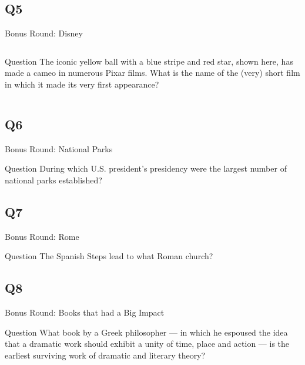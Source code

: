 \documentclass[11pt]{beamer}
\begin{document}
\subsection*{Q5}
\begin{frame}[t]{Bonus Round: Disney}
\begin{columns}[T,totalwidth=\linewidth]
\begin{column}{0.32\linewidth}
\begin{block}{Question}
The iconic yellow ball with a blue stripe and red star, shown here, has made a cameo in numerous Pixar films. What is the name of the (very) short film in which it made its very first appearance?
\end{block}
\end{column}
\begin{column}{0.65\linewidth}
\begin{center}
\texttt{[image: \{Images/luxoball]}.jpg}
\end{center}
\end{column}
\end{columns}
\end{frame}
\subsection*{Q6}
\begin{frame}[t]{Bonus Round: National Parks}
\begin{block}{Question}
During which U.S. president's presidency were the largest number of national parks established?
\end{block}
\end{frame}
\subsection*{Q7}
\begin{frame}[t]{Bonus Round: Rome}
\begin{block}{Question}
The Spanish Steps lead to what Roman church?
\end{block}
\end{frame}
\subsection*{Q8}
\begin{frame}[t]{Bonus Round: Books that had a Big Impact}
\begin{block}{Question}
What book by a Greek philosopher --- in which he  espoused the idea that a dramatic work should exhibit a unity of time, place and action --- is the earliest surviving work of dramatic and literary theory? 
\end{block}
\end{frame}
\end{document}
